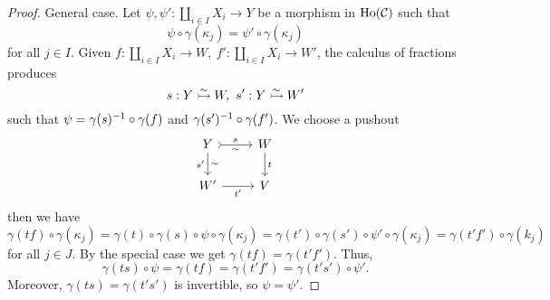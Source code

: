 \begin{proof}
General case. Let $\psi,\psi':\coprod_{i\in I}X_i\to Y$ be a morphism in $\operatorname{Ho}(\mathcal{C})$ such that
\[\psi\circ\gamma(\kappa_j)=\psi'\circ\gamma(\kappa_j)\]
for all $j\in I$. Given $f:\coprod_{i\in I}X_i\to W,\ f':\coprod_{i\in I}X_i\to W'$, the calculus of fractions produces
\[s:Y\acco W,\ s':Y\acco W'\]
such that $\psi=\gamma(s)^{-1}\circ\gamma(f)$ and $\gamma(s')^{-1}\circ\gamma(f')$. We choose a pushout
\[
\begin{tikzcd}
 Y \ar[d,"s'"',"\sim"] \ar[r,tail,"s","\sim"'] & W \ar[d,"t"]\\
W' \ar[r,"t'"'] & V
\end{tikzcd}
\]
then we have
\[\gamma(tf)\circ\gamma(\kappa_j)=\gamma(t)\circ\gamma(s)\circ\psi\circ\gamma(\kappa_j)=\gamma(t')\circ\gamma(s')\circ\psi'\circ\gamma(\kappa_j)=\gamma(t'f')\circ\gamma(k_j)\]
for all $j\in J$. By the special case we get $\gamma(tf)=\gamma(t'f')$. Thus,
\[\gamma(ts)\circ\psi=\gamma(tf)=\gamma(t'f')=\gamma(t's')\circ\psi'.\]
Moreover, $\gamma(ts)=\gamma(t's')$ is invertible, so $\psi=\psi'$.
\end{proof}
